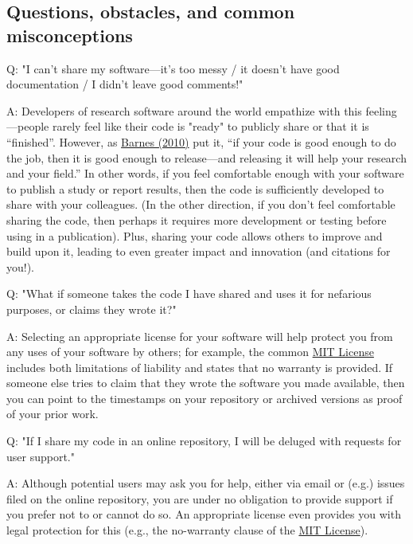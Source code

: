 \documentclass{article}
\begin{document}
\subsection{Questions, obstacles, and common misconceptions}\label{questions-obstacles-and-common-misconceptions}



Q: "I can’t share my software—it’s too messy / it doesn’t have good documentation / I didn’t leave good comments!"


A: Developers of research software around the world empathize with this feeling—people rarely feel like their code is "ready" to publicly share or that it is “finished”. However, as \href{https://doi.org/10/cj8t6n}{Barnes (2010)} put it, “if your code is good enough to do the job, then it is good enough to release—and releasing it will help your research and your field.” In other words, if you feel comfortable enough with your software to publish a study or report results, then the code is sufficiently developed to share with your colleagues. (In the other direction, if you don’t feel comfortable sharing the code, then perhaps it requires more development or testing before using in a publication). Plus, sharing your code allows others to improve and build upon it, leading to even greater impact and innovation (and citations for you!).


Q: "What if someone takes the code I have shared and uses it for nefarious purposes, or claims they wrote it?"


A: Selecting an appropriate license for your software will help protect you from any uses of your software by others; for example, the common \href{https://choosealicense.com/licenses/mit/}{MIT License} includes both limitations of liability and states that no warranty is provided. If someone else tries to claim that they wrote the software you made available, then you can point to the timestamps on your repository or archived versions as proof of your prior work.


Q: "If I share my code in an online repository, I will be deluged with requests for user support."


A: Although potential users may ask you for help, either via email or (e.g.) issues filed on the online repository, you are under no obligation to provide support if you prefer not to or cannot do so. An appropriate license even provides you with legal protection for this (e.g., the no-warranty clause of the \href{https://choosealicense.com/licenses/mit/}{MIT License}).
\end{document}
